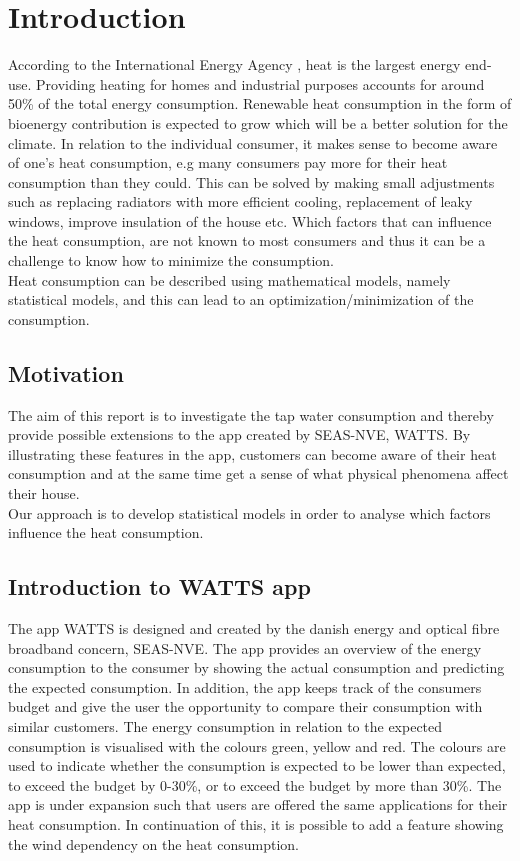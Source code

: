 \chapter{Introduction}
\noindent According to the International Energy Agency \cite{iea}, heat is the largest energy end-use. Providing heating for homes and industrial purposes accounts for around 50\% of the total energy consumption. Renewable heat consumption in the form of bioenergy contribution is expected to grow which will be a better solution for the climate. In relation to the individual consumer, it makes sense to become aware of one's heat consumption, e.g many consumers pay more for their heat consumption than they could. This can be solved by making small adjustments such as replacing radiators with more efficient cooling, replacement of leaky windows, improve insulation of the house etc. Which factors that can influence the heat consumption, are not known to most consumers and thus it can be a challenge to know how to minimize the consumption. \\

\noindent Heat consumption can be described using mathematical models, namely statistical models, and this can lead to an optimization/minimization of the consumption.


\section{Motivation}
The aim of this report is to investigate the tap water consumption and thereby provide possible extensions to the app created by SEAS-NVE, WATTS. By illustrating these features in the app, customers can become aware of their heat consumption and at the same time get a sense of what physical phenomena affect their house. \\

\noindent Our approach is to develop statistical models in order to analyse which factors influence the heat consumption.

\section{Introduction to WATTS app}
The app WATTS is designed and created by the danish energy and optical fibre broadband concern, SEAS-NVE. The app provides an overview of the energy consumption to the consumer by showing the actual consumption and predicting the expected consumption. In addition, the app keeps track of the consumers budget and give the user the opportunity to compare their consumption with similar customers. The energy consumption in relation to the expected consumption is visualised with the colours green, yellow and red. The colours are used to indicate whether the consumption is expected to be lower than expected, to exceed the budget by 0-30\%, or to exceed the budget by more than 30\%.
\noindent The app is under expansion such that users are offered the same applications for their heat consumption. In continuation of this, it is possible to add a feature showing the wind dependency on the heat consumption.